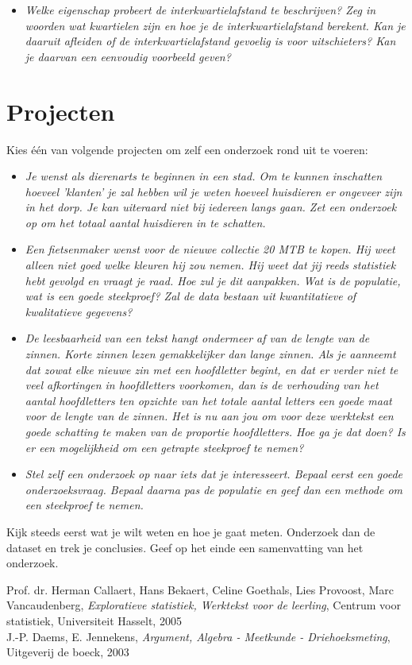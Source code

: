 \documentclass[11pt]{article}
\newcommand{\vraag}[2]{\begin{itemize}\item {\it #1} \vspace*{#2}\end{itemize}}
\begin{document}
\vraag{Welke eigenschap probeert de interkwartielafstand te beschrijven? Zeg in woorden wat
kwartielen zijn en hoe je de interkwartielafstand berekent. Kan je daaruit afleiden of de
interkwartielafstand gevoelig is voor uitschieters? Kan je daarvan een eenvoudig voorbeeld
geven?}{8cm}

\newpage
\section{Projecten}

Kies één van volgende projecten om zelf een onderzoek rond uit te voeren:

\vraag{Je wenst als dierenarts te beginnen in een stad. Om te kunnen inschatten hoeveel
'klanten' je zal hebben wil je weten hoeveel huisdieren er ongeveer zijn in het dorp. Je
kan uiteraard niet bij iedereen langs gaan. Zet een onderzoek op om het totaal aantal
huisdieren in te schatten.}{1cm}


\vraag{Een fietsenmaker wenst voor de nieuwe collectie 20 MTB te kopen. Hij weet alleen
niet goed welke kleuren hij zou nemen. Hij weet dat jij reeds statistiek hebt gevolgd en vraagt
je raad. Hoe zul je dit aanpakken. Wat is de populatie, wat is een goede steekproef? Zal de
data bestaan uit kwantitatieve of kwalitatieve gegevens?}{1cm}

\vraag{De leesbaarheid van een tekst hangt ondermeer af van de lengte van de zinnen. Korte zinnen
lezen gemakkelijker dan lange zinnen. Als je aanneemt dat zowat elke nieuwe zin met een
hoofdletter begint, en dat er verder niet te veel afkortingen in hoofdletters voorkomen, dan is
de verhouding van het aantal hoofdletters ten opzichte van het totale aantal letters een goede
maat voor de lengte van de zinnen. Het is nu aan jou om voor deze werktekst een goede schatting te
maken van de proportie hoofdletters. Hoe ga je dat doen? Is er een mogelijkheid om een getrapte
steekproef te nemen?}{1cm}

\vraag{Stel zelf een onderzoek op naar iets dat je interesseert. Bepaal eerst een goede
onderzoeksvraag. Bepaal daarna pas de populatie en geef dan een methode om een steekproef
te nemen.}{1cm}

Kijk steeds eerst wat je wilt weten en hoe je gaat meten. Onderzoek dan de dataset en trek je
conclusies. Geef op het einde een samenvatting van het onderzoek.

\begin{thebibliography}{1}
\label{1} Prof. dr. Herman Callaert, Hans Bekaert, Celine Goethals, Lies Provoost, Marc Vancaudenberg, \textit{Exploratieve statistiek, Werktekst voor de leerling}, Centrum voor statistiek, Universiteit Hasselt, 2005\\
\label{2} J.-P. Daems, E. Jennekens, \textit{Argument, Algebra - Meetkunde - Driehoeksmeting}, Uitgeverij de boeck, 2003\\
\end{thebibliography}

\end{document}
